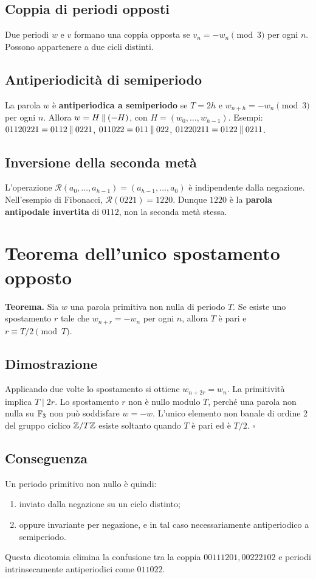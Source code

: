 \documentclass[11pt,a4paper]{article}
\begin{document}
\subsection{Coppia di periodi opposti}
Due periodi \(w\) e \(v\) formano una coppia opposta se \(v_n=-w_n\pmod3\) per ogni \(n\). Possono appartenere a due cicli distinti.
\subsection{Antiperiodicità di semiperiodo}
La parola \(w\) è \textbf{antiperiodica a semiperiodo} se \(T=2h\) e \(w_{n+h}=-w_n\pmod3\) per ogni \(n\). Allora \(w=H\mathbin{\Vert}(-H)\), con \(H=(w_0,\ldots,w_{h-1})\). Esempi: \(01120221=0112\mathbin{\Vert}0221\), \(011022=011\mathbin{\Vert}022\), \(01220211=0122\mathbin{\Vert}0211\).
\subsection{Inversione della seconda metà}
L’operazione \(\mathcal R(a_0,\ldots,a_{h-1})=(a_{h-1},\ldots,a_0)\) è indipendente dalla negazione. Nell’esempio di Fibonacci, \(\mathcal R(0221)=1220\). Dunque \(1220\) è la \textbf{parola antipodale invertita} di \(0112\), non la seconda metà stessa.
\section{Teorema dell’unico spostamento opposto}
\begin{summarybox}\textbf{Teorema.} Sia \(w\) una parola primitiva non nulla di periodo \(T\). Se esiste uno spostamento \(r\) tale che \(w_{n+r}=-w_n\) per ogni \(n\), allora \(T\) è pari e \(r\equiv T/2\pmod T\).\end{summarybox}
\subsection*{Dimostrazione}
Applicando due volte lo spostamento si ottiene \(w_{n+2r}=w_n\). La primitività implica \(T\mid2r\). Lo spostamento \(r\) non è nullo modulo \(T\), perché una parola non nulla su \(\mathbb F_3\) non può soddisfare \(w=-w\). L’unico elemento non banale di ordine 2 del gruppo ciclico \(\mathbb Z/T\mathbb Z\) esiste soltanto quando \(T\) è pari ed è \(T/2\). \hfill\(\square\)
\subsection*{Conseguenza}
Un periodo primitivo non nullo è quindi: \begin{enumerate}\item inviato dalla negazione su un ciclo distinto;\item oppure invariante per negazione, e in tal caso necessariamente antiperiodico a semiperiodo.\end{enumerate} Questa dicotomia elimina la confusione tra la coppia \(00111201,00222102\) e periodi intrinsecamente antiperiodici come \(011022\).
\end{document}

